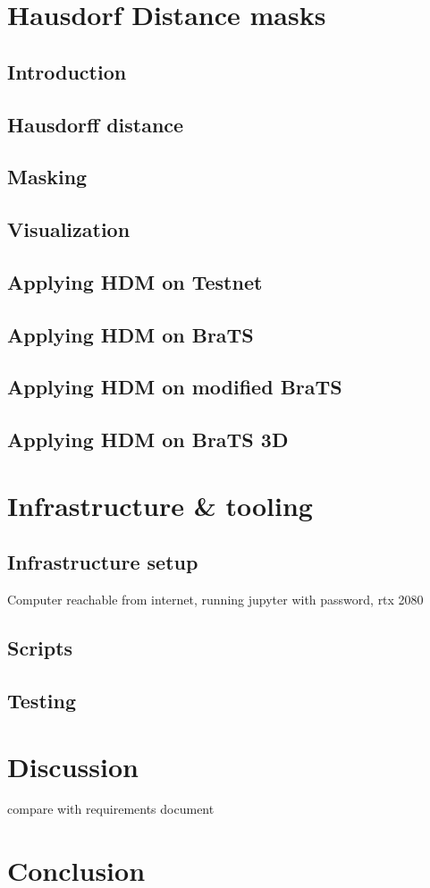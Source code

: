 \chapter{Hausdorf Distance masks}
\section{Introduction}
\section{Hausdorff distance}
\section{Masking}
\section{Visualization}
\section{Applying HDM on Testnet}
\section{Applying HDM on BraTS}
\section{Applying HDM on modified BraTS}
\section{Applying HDM on BraTS 3D}

\chapter{Infrastructure \& tooling}
\section{Infrastructure setup}
Computer reachable from internet, running jupyter with password,
rtx 2080

\section{Scripts}

\section{Testing}


\chapter{Discussion}
compare with requirements document

\chapter{Conclusion}